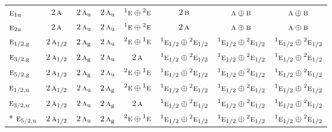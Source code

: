 \documentclass[10pt,a4paper]{article}
\numberwithin{equation}{section}
\newcommand{\irr}[1]{\text{\normalfont\scshape #1}}
\newcommand{\conjpair}[1]{{}^{#1}}
\newcommand{\ptag}[1]{\mathrm{#1}}
\begin{document}
{\begin{longtable}{@{}lccccccc@{}}
$\irr{e}_{1\ptag{u}}$ & $2\,\irr{a}$ & $2\,\irr{a}_{\ptag{u}}$ & $2\,\irr{a}_{\ptag{u}}$ & $\conjpair{1}\irr{e}\oplus \conjpair{2}\irr{e}$ & $2\,\irr{b}$ & $\irr{a}\oplus \irr{b}$ & $\irr{a}\oplus \irr{b}$\\
$\irr{e}_{2\ptag{u}}$ & $2\,\irr{a}$ & $2\,\irr{a}_{\ptag{u}}$ & $2\,\irr{a}_{\ptag{u}}$ & $\conjpair{1}\irr{e}\oplus \conjpair{2}\irr{e}$ & $2\,\irr{a}$ & $\irr{a}\oplus \irr{b}$ & $\irr{a}\oplus \irr{b}$\\
$\irr{e}_{1/2,\ptag{g}}$ & $2\,\irr{a}_{1/2}$ & $2\,\irr{a}_{\ptag{g}}$ & $2\,\irr{a}_{\ptag{u}}$ & $\conjpair{2}\irr{e}\oplus \conjpair{1}\irr{e}$ & $\conjpair{1}\irr{e}_{1/2}\oplus \conjpair{2}\irr{e}_{1/2}$ & $\conjpair{1}\irr{e}_{1/2}\oplus \conjpair{2}\irr{e}_{1/2}$ & $\conjpair{1}\irr{e}_{1/2}\oplus \conjpair{2}\irr{e}_{1/2}$\\
$\irr{e}_{3/2,\ptag{g}}$ & $2\,\irr{a}_{1/2}$ & $2\,\irr{a}_{\ptag{g}}$ & $2\,\irr{a}_{\ptag{u}}$ & $2\,\irr{a}$ & $\conjpair{1}\irr{e}_{1/2}\oplus \conjpair{2}\irr{e}_{1/2}$ & $\conjpair{1}\irr{e}_{1/2}\oplus \conjpair{2}\irr{e}_{1/2}$ & $\conjpair{1}\irr{e}_{1/2}\oplus \conjpair{2}\irr{e}_{1/2}$\\
$\irr{e}_{5/2,\ptag{g}}$ & $2\,\irr{a}_{1/2}$ & $2\,\irr{a}_{\ptag{g}}$ & $2\,\irr{a}_{\ptag{u}}$ & $\conjpair{2}\irr{e}\oplus \conjpair{1}\irr{e}$ & $\conjpair{1}\irr{e}_{1/2}\oplus \conjpair{2}\irr{e}_{1/2}$ & $\conjpair{1}\irr{e}_{1/2}\oplus \conjpair{2}\irr{e}_{1/2}$ & $\conjpair{1}\irr{e}_{1/2}\oplus \conjpair{2}\irr{e}_{1/2}$\\
$\irr{e}_{1/2,\ptag{u}}$ & $2\,\irr{a}_{1/2}$ & $2\,\irr{a}_{\ptag{u}}$ & $2\,\irr{a}_{\ptag{g}}$ & $\conjpair{2}\irr{e}\oplus \conjpair{1}\irr{e}$ & $\conjpair{1}\irr{e}_{1/2}\oplus \conjpair{2}\irr{e}_{1/2}$ & $\conjpair{1}\irr{e}_{1/2}\oplus \conjpair{2}\irr{e}_{1/2}$ & $\conjpair{1}\irr{e}_{1/2}\oplus \conjpair{2}\irr{e}_{1/2}$\\
$\irr{e}_{3/2,\ptag{u}}$ & $2\,\irr{a}_{1/2}$ & $2\,\irr{a}_{\ptag{u}}$ & $2\,\irr{a}_{\ptag{g}}$ & $2\,\irr{a}$ & $\conjpair{1}\irr{e}_{1/2}\oplus \conjpair{2}\irr{e}_{1/2}$ & $\conjpair{1}\irr{e}_{1/2}\oplus \conjpair{2}\irr{e}_{1/2}$ & $\conjpair{1}\irr{e}_{1/2}\oplus \conjpair{2}\irr{e}_{1/2}$\\*
$\irr{e}_{5/2,\ptag{u}}$ & $2\,\irr{a}_{1/2}$ & $2\,\irr{a}_{\ptag{u}}$ & $2\,\irr{a}_{\ptag{g}}$ & $\conjpair{2}\irr{e}\oplus \conjpair{1}\irr{e}$ & $\conjpair{1}\irr{e}_{1/2}\oplus \conjpair{2}\irr{e}_{1/2}$ & $\conjpair{1}\irr{e}_{1/2}\oplus \conjpair{2}\irr{e}_{1/2}$ & $\conjpair{1}\irr{e}_{1/2}\oplus \conjpair{2}\irr{e}_{1/2}$\\
\bottomrule\end{longtable}}
\end{document}
